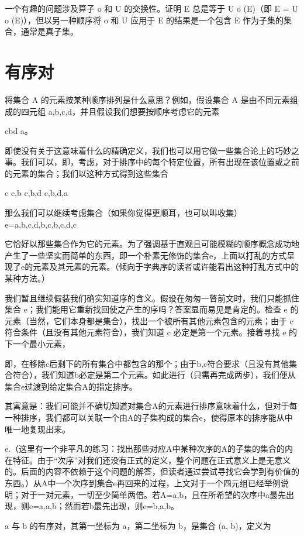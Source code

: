 \documentclass[12pt,a4paper]{ctexbook}
\theoremstyle{definition}
\theoremstyle{remark}
\begin{document}
一个有趣的问题涉及算子 o 和 U 的交换性。证明 E 总是等于 U o (E)（即 E = U o (E)），但以另一种顺序将 o 和 U 应用于 E 的结果是一个包含 E 作为子集的集合，通常是真子集。


\chapter{有序对}

将集合 A 的元素按某种顺序排列是什么意思？例如，假设集合 A 是由不同元素组成的四元组 {a,b,c,d}，并且假设我们想要按顺序考虑它的元素

cbd a。

即使没有关于这意味着什么的精确定义，我们也可以用它做一些集合论上的巧妙之事。我们可以，即，考虑，对于排序中的每个特定位置，所有出现在该位置或之前的元素的集合；我们以这种方式得到这些集合

{c} {c,b} {c,b,d} {c,b,d,a}

那么我们可以继续考虑集合（如果你觉得更顺耳，也可以叫收集）e={{a,b,c,d},{b,c},{b,c,d},{c}}

它恰好以那些集合作为它的元素。为了强调基于直观且可能模糊的顺序概念成功地产生了一些坚实而简单的东西，即一个朴素无修饰的集合e，上面以打乱的方式呈现了e的元素及其元素的元素。（倾向于字典序的读者或许能看出这种打乱方式中的某种方法。）

我们暂且继续假装我们确实知道序的含义。假设在匆匆一瞥前文时，我们只能抓住集合 e；我们能用它重新找回使之产生的序吗？答案显而易见是肯定的。检查 e 的元素（当然，它们本身都是集合），找出一个被所有其他元素包含的元素；由于 {c} 符合条件（且没有其他元素符合），我们知道 c 必定是第一个元素。接着寻找 e 的下一个最小元素，

即，在移除{c}后剩下的所有集合中都包含的那个；由于{b,c}符合要求（且没有其他集合符合），我们知道b必定是第二个元素。如此进行（只需再完成两步），我们便从集合e过渡到给定集合A的指定排序。

其寓意是：我们可能并不确切知道对集合A的元素进行排序意味着什么，但对于每一种排序，我们都可以关联一个由A的子集构成的集合e，使得原本的排序能从中唯一地复现出来。

e.（这里有一个非平凡的练习：找出那些对应A中某种次序的A的子集的集合的内在特征。由于“次序”对我们还没有正式的定义，整个问题在正式意义上是无意义的。后面的内容不依赖于这个问题的解答，但读者通过尝试寻找它会学到有价值的东西。）从A中一个次序到集合e再回来的过程，上文对于一个四元组已经举例说明；对于一对元素，一切至少简单两倍。若A={a,b}，且在所希望的次序中a最先出现，则e={{a},{a,b}}；然而若b最先出现，则e={{b},{a,b}}。

a 与 b 的有序对，其第一坐标为 a，第二坐标为 b，是集合 (a, b)，定义为
\end{document}

